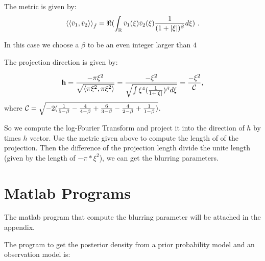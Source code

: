 \documentclass[11pt] {article}
\newcommand{\inner}[2]{\left\langle #1,#2 \right\rangle}
\newcommand{\innerd}[2]{\left\langle \left\langle#1,#2 \right\rangle\right\rangle}
\newcommand{\real}{\ensuremath{\mathbb{R}}}
\begin{document}
The metric is given by:
\begin{equation}
\innerd{\tilde{v}_1}{\tilde{v}_2}_{\tilde{f}} = \Re(\int_{\real} \tilde{v}_1(\xi) 
\tilde{v}_2(\xi)  {1 \over (1  + |\xi|)^{\beta}} d\xi)\ . \label{eq:metric2}
\end{equation}

In this case we choose a $\beta $ to be an even integer larger than $4$

The projection direction is given by:
     
$$
{\bf h} = {-\pi \xi^2 \over \sqrt{\inner{\pi \xi^2}{\pi \xi^2}}}
={-\xi^2 \over \sqrt{ \int \xi^4 ({1 \over {1+|\xi|}})^{\beta} d\xi } } 
= {-{\xi^2}\over {\cal C }},
$$
where ${\cal C } =  {\sqrt {-2( {1 \over {5-\beta}}-{4 \over {4- \beta}}+{6 \over {3-\beta}} -{4 \over {2-\beta}}+{1 \over {1-\beta}} )}}$.


So we compute the log-Fourier Transform and project it into the direction of $h$ by times $h$ vector. Use the metric given above to compute the length of 
of the projection.  Then the difference of the projection length divide the unite length (given by the length of $-\pi*\xi^2$), we can get the blurring parameters. 


\section{Matlab Programs}
The matlab program that compute the blurring parameter will be attached in the appendix. 

The program to get the posterior density from a prior probability model and an observation model is:
\end{document}
